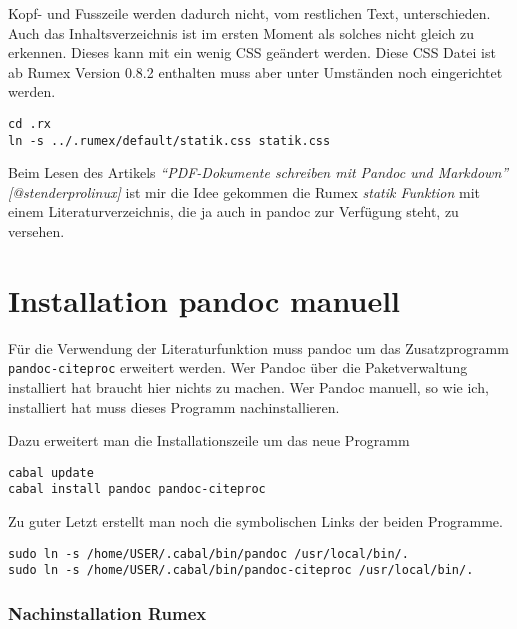 Kopf- und Fusszeile werden dadurch nicht, vom restlichen Text,
unterschieden. Auch das Inhaltsverzeichnis ist im ersten Moment als
solches nicht gleich zu erkennen. Dieses kann mit ein wenig CSS geändert
werden. Diese CSS Datei ist ab Rumex Version 0.8.2 enthalten muss aber
unter Umständen noch eingerichtet werden.

\begin{verbatim}
cd .rx
ln -s ../.rumex/default/statik.css statik.css
\end{verbatim}


Beim Lesen des Artikels \emph{``PDF-Dokumente schreiben mit Pandoc und
Markdown'' {[}@stenderprolinux{]}} ist mir die Idee gekommen die Rumex
\emph{statik Funktion} mit einem Literaturverzeichnis, die ja auch in
pandoc zur Verfügung steht, zu versehen.

\section{Installation pandoc manuell}\label{installation-pandoc-manuell}

Für die Verwendung der Literaturfunktion muss pandoc um das
Zusatzprogramm \texttt{pandoc-citeproc} erweitert werden. Wer Pandoc
über die Paketverwaltung installiert hat braucht hier nichts zu machen.
Wer Pandoc manuell, so wie ich, installiert hat muss dieses Programm
nachinstallieren.

Dazu erweitert man die Installationszeile um das neue Programm

\begin{verbatim}
cabal update
cabal install pandoc pandoc-citeproc
\end{verbatim}

Zu guter Letzt erstellt man noch die symbolischen Links der beiden
Programme.

\begin{verbatim}
sudo ln -s /home/USER/.cabal/bin/pandoc /usr/local/bin/.
sudo ln -s /home/USER/.cabal/bin/pandoc-citeproc /usr/local/bin/.
\end{verbatim}

\subsubsection{Nachinstallation Rumex}\label{nachinstallation-rumex}

